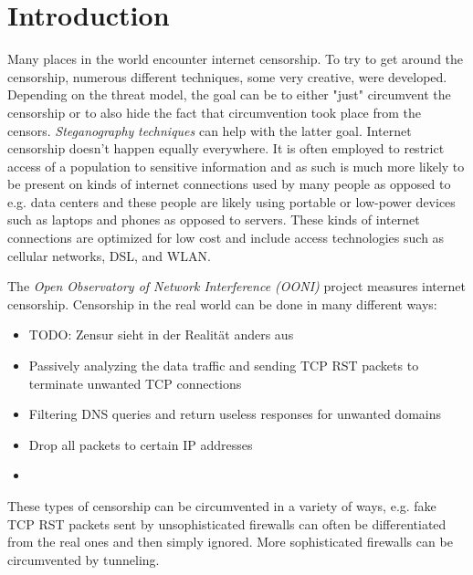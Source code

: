 
\chapter{Introduction}


Many places in the world encounter internet censorship.
To try to get around the censorship, numerous different techniques, some very creative, were developed.
Depending on the threat model, the goal can be to either "just" circumvent the censorship or to also hide the fact that circumvention took place from the censors.
\textit{Steganography} \cite{wiki:Steganography} \textit{techniques} \cite{wiki:List_of_steganography_techniques} can help with the latter goal.
Internet censorship doesn't happen equally everywhere.
It is often employed to restrict access of a population to sensitive information and as such is much more likely to be present on kinds of internet connections used by many people as opposed to e.g. data centers and these people are likely using portable or low-power devices such as laptops and phones as opposed to servers.
These kinds of internet connections are optimized for low cost and include access technologies such as cellular networks, DSL, and WLAN.


The \textit{Open Observatory of Network Interference (OONI)} \cite{OONI} project measures internet censorship.
Censorship in the real world can be done in many different ways:
\begin{itemize}
  \item TODO: Zensur sieht in der Realität anders aus
  \item Passively analyzing the data traffic and sending TCP RST packets to terminate unwanted TCP connections
  \item Filtering DNS queries and return useless responses for unwanted domains
  \item Drop all packets to certain IP addresses
  \item {}
\end{itemize}
These types of censorship can be circumvented in a variety of ways, e.g. fake TCP RST packets sent by unsophisticated firewalls can often be differentiated from the real ones and then simply ignored.
More sophisticated firewalls can be circumvented by tunneling.

